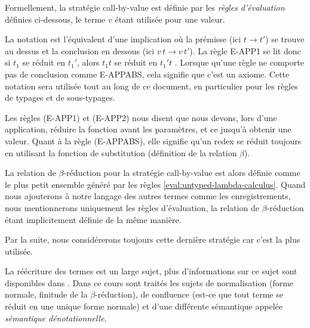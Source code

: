 Formellement, la stratégie call-by-value est définie par les \textit{règles
  d'évaluation} définies ci-dessous, le terme $v$ étant utilisée pour une valeur.

\label{eval:untyped-lambda-calculus}

La notation  est
l'équivalent d'une implication où la prémisse (ici $t \rightarrow t'$) se trouve au dessus et la
conclusion en dessous (ici $v \, t \rightarrow v \, t'$). La règle E-APP1 se lit
donc \og si $t_{1}$ se réduit en $t_{1}'$, alors $t_{1} t$ se réduit en
$t_{1}'t$ \fg. Lorsque qu'une règle
ne comporte pas de conclusion comme E-APPABS, cela signifie que c'est un axiome.
Cette notation sera
utilisée tout au long de ce document, en particulier pour les règles de typages
et de sous-typages.

Les règles (E-APP1) et (E-APP2) nous disent que nous devons, lors d'une
application, réduire la fonction avant les paramètres, et ce jusqu'à obtenir une
valeur. Quant à la règle (E-APPABS), elle signifie qu'un redex se réduit toujours
en utilisant la fonction de substitution (définition de la relation $\beta$).

La relation de $\beta$-réduction pour la stratégie call-by-value est alors
définie comme le plus petit ensemble généré par les règles
\ref{eval:untyped-lambda-calculus}. Quand nous ajouterons à notre langage des
autres termes comme les enregistrements, nous mentionnerons uniquement les
règles d'évaluation, la relation de $\beta$-réduction étant implicitement
définie de la même manière.

Par la suite, nous considérerons toujours cette dernière stratégie car c'est la
plus utilisée.

La réécriture des termes est un large sujet, plus d'informations sur ce sujet
sont disponibles dans \cite{ENS-Cachan-cours-lambda-calcul}.
Dans ce cours sont traités les sujets de normalisation (forme normale, finitude
de la $\beta$-réduction), de confluence (est-ce que tout terme se réduit en une
unique forme normale) et d'une différente sémantique appelée \textit{sémantique
dénotationnelle}.

